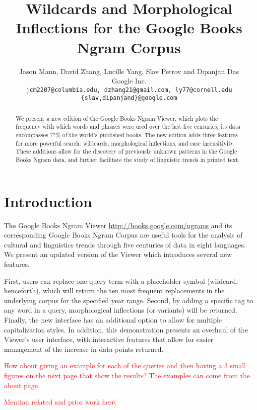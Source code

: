 \documentclass[11pt]{article}
\title{Wildcards and Morphological Inflections for the Google Books Ngram Corpus}
\author{Jason Mann, David Zhang, Lucille Yang, Slav Petrov and Dipanjan Das\\
	Google Inc. \\
	{\tt jcm2207@columbia.edu, dzhang21@gmail.com, ly77@cornell.edu}\\
	{\tt \{slav,dipanjand\}@google.com}}
\date{}
\begin{document}
\maketitle

\begin{abstract}

We present a new edition of the Google Books Ngram Viewer, which plots
the frequency with which words and phrases were used over the last five
centuries; its data encompasses ??\% of the world's published books.
The new edition adds three features for more powerful search: wildcards,
morphological inflections, and case insensitivity. These additions allow
for the discovery of previously unknown patterns in the Google Books Ngram data,
and further facilitate the study of linguistic trends in printed text.

\end{abstract}

\section{Introduction}

The Google Books Ngram Viewer \url{http://books.google.com/ngrams} and its corresponding Google Books Ngram Corpus \cite{lin2012syntactic} are useful tools for the analysis of cultural and linguistics trends through five centuries of data in eight languages. We present an updated version of the Viewer which introduces several new features. 

First, users can replace one query term with a placeholder symbol (wildcard, henceforth), which will return the ten most frequent replacements in the underlying corpus for the specified year range. Second, by adding a specific tag to any word in a query, morphological inflections (or variants) will be returned. Finally, the new interface has an additional option to allow for multiple capitalization styles. In addition, this demonstration presents an overhaul of the Viewer's user interface, with interactive features that allow for easier management of the increase in data points returned.

\vspace{1em}
\textcolor{red}{How about giving an example for each of the queries and then having a 3 small figures on the next page that show the results? The examples can come from the about page.}
\vspace{1em}

\vspace{1em}
\textcolor{red}{Mention related and prior work here.}
\vspace{1em}
\end{document}
